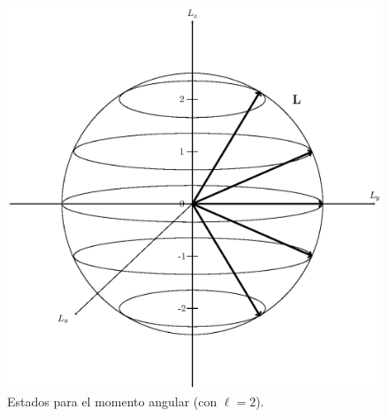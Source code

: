 \begin{figure}[H]
    \centering
    \includegraphics[scale=0.75]{Imagenes/Momento_angular_01.eps}
    \caption{Estados para el momento angular (con $\ell=2$).}
    \label{fig:momento_angular_02}
\end{figure}

